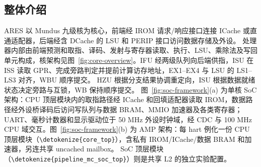 \documentclass[UTF8,a4paper,12pt,fontset=none,scheme=plain]{ctexart}
\newcommand{\code}[1]{\texttt{\detokenize{#1}}}
\renewcommand{\code}[1]{{\small\ttfamily\urlstyle{tt}\expandafter\nolinkurl\expandafter{\detokenize{#1}}}}
\begin{document}
\subsection{整体介绍}
ARES 以 Mundus 九级核为核心，前端经 IROM 请求/响应接口连接 ICache 或直通适配器，后端经含 DCache 的 LSU 和 PERIP 接口访问数据存储及外设。
处理器内部由前端预测和取指、译码、发射与寄存器读取、执行、LSU、乘除法及写回单元构成，核架构见图~\ref{fig:core-overview}。IFU 经两级队列向后端供指，ISU 在 ISS 读取 GPR、完成旁路判定并提前计算访存地址，EX1--EX4 与 LSU 的 LS1--LS3 对齐，WBU 顺序提交。
HZU 根据分支结果协调重定向，ISU 根据数据就绪状态决定旁路与互锁，WB 保持顺序提交。
图~\ref{fig:soc-framework}(a) 为单核 SoC 架构：CPU 顶层模块内的取指路径经 ICache 和回填适配器读取 IROM，数据路径经外设桥译码后访问写队列与数据 BRAM、MMIO 加速器及各类寄存器；UART、毫秒计数器和显示驱动位于 50 MHz 外设时钟域，经 CDC 与 100 MHz CPU 域交互。图~\ref{fig:soc-framework}(b) 为 AMP 架构：每 hart 例化一份 CPU 顶层模块（\code{core_top}），含私有 IROM/ICache/数据 BRAM 和加速器，另连共享 uncached mailbox。
SoC 顶层模块（\code{pipeline_mc_soc_top}）则是共享 L2 的独立实验配置。
\end{document}
